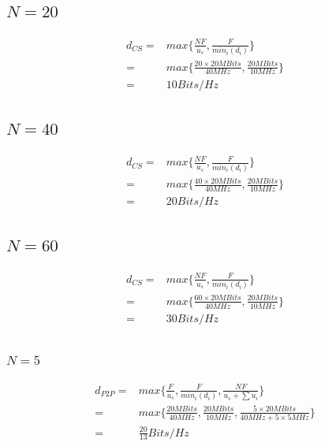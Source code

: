 \documentclass{article}
\begin{document}
            \subsection*{$N=20$}
                \begin{equation*}
                    \begin{split}
                        d_{CS}=&max\{\frac{NF}{u_s},\frac{F}{{min}_i(d_i)}\}\\
                            =&max\{\frac{20\times 20MBits}{40MHz},\frac{20MBits}{10MHz}\}\\
                            =&{10}{ Bits/Hz}
                    \end{split}
                \end{equation*}
            \subsection*{$N=40$}
                \begin{equation*}
                    \begin{split}
                        d_{CS}=&max\{\frac{NF}{u_s},\frac{F}{{min}_i(d_i)}\}\\
                            =&max\{\frac{40\times 20MBits}{40MHz},\frac{20MBits}{10MHz}\}\\
                            =&{20}{ Bits/Hz}
                    \end{split}
                \end{equation*}
            \subsection*{$N=60$}
                \begin{equation*}
                    \begin{split}
                        d_{CS}=&max\{\frac{NF}{u_s},\frac{F}{{min}_i(d_i)}\}\\
                            =&max\{\frac{60\times 20MBits}{40MHz},\frac{20MBits}{10MHz}\}\\
                            =&{30}{ Bits/Hz}
                    \end{split}
                \end{equation*}
        \subsection{}
            \subsubsection*{$N=5$}
                \begin{equation*}
                    \begin{split}
                        d_{P2P}=&max\{\frac{F}{u_s},\frac{F}{{min}_i(d_i)},\frac{NF}{u_s+\sum u_i}\}\\
                            =&max\{\frac{20MBits}{40MHz},\frac{20MBits}{10MHz},\frac{5\times 20MBits }{40MHz+5\times 5MHz}\}\\
                            =&\frac{20}{13}Bits/Hz
                    \end{split}
                \end{equation*}
\end{document}
